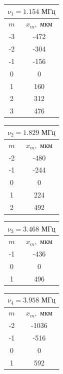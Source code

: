 \documentclass[a4paper,12pt]{article} %
\begin{document}
\begin{enumerate}
    \begin{table}[h]
        \centering
        \begin{tabular}{|c|c|}
        \hline
            \multicolumn{2}{|c|}{$\nu_1=1.154\text{ МГц}$} \\ \hline
        \hline
    	$m$ & $x_m, \text{ мкм}$ \\ \hline
    	-3 & -472 \\ \hline
    	-2 & -304 \\ \hline
    	-1 & -156 \\ \hline
    	0 & 0 \\ \hline
    	1 & 160 \\ \hline
    	2 & 312 \\ \hline
            3 & 476 \\ \hline
        \end{tabular}
        \begin{tabular}{|c|c|}
        \hline
            \multicolumn{2}{|c|}{$\nu_2=1.829\text{ МГц}$} \\ \hline
        \hline
    	$m$ & $x_m, \text{ мкм}$ \\ \hline
    	-2 & -480 \\ \hline
    	-1 & -244 \\ \hline
    	0 & 0 \\ \hline
    	1 & 224 \\ \hline
    	2 & 492 \\ \hline
        \end{tabular}
        \begin{tabular}{|c|c|}
        \hline
            \multicolumn{2}{|c|}{$\nu_3=3.468\text{ МГц}$} \\ \hline
        \hline
    	$m$ & $x_m, \text{ мкм}$ \\ \hline
    	-1 & -436 \\ \hline
    	0 & 0 \\ \hline
    	1 & 496 \\ \hline
        \end{tabular}
        \begin{tabular}{|c|c|}
        \hline
            \multicolumn{2}{|c|}{$\nu_4=3.958\text{ МГц}$} \\ \hline
        \hline
    	$m$ & $x_m, \text{ мкм}$ \\ \hline
    	-2 & -1036 \\ \hline
    	-1 & -516 \\ \hline
    	0 & 0 \\ \hline
    	1 & 592 \\ \hline

\end{tabular}
\end{table}
\end{enumerate}
\end{document}

